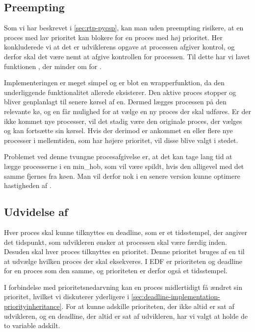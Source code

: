 \subsection{Preempting}

Som vi har beskrevet i \cref{sec:rtp-pycsp}, kan  man uden preempting risikere, at en proces med lav prioritet kan blokere for en proces med høj prioritet. 
Her konkluderede vi at det er udviklerens opgave at processen afgiver kontrol, og derfor skal det være nemt at afgive kontrollen for processen. Til dette har vi lavet funktionen , der minder om  for .

Implementeringen er meget simpel og er blot en wrapperfunktion, da den underliggende funktionalitet allerede eksisterer. Den aktive proces stopper og bliver genplanlagt til senere kørsel af \sched en. Dermed lægges processen på den relevante kø, og  \sched en får mulighed for at vælge en ny proces der skal udføres. Er der ikke kommet nye processer, vil det stadig være den originale proces, der vælges og kan fortsætte sin kørsel. Hvis der derimod er ankommet en eller flere nye processer i mellemtiden, som har højere prioritet, vil disse blive valgt i stedet.

Problemet ved denne tvungne procesafgivelse er, at det kan tage lang tid at lægge processerne i en min\_hob, som vil være spildt, hvis den alligevel med det samme fjernes fra køen. Man vil derfor nok i en senere version kunne optimere hastigheden af .

\subsection{Udvidelse af }
Hver proces skal kunne tilknyttes en deadline, som er et tidsstempel, der angiver det tidspunkt, som udvikleren ønsker at processen skal være færdig inden. 
Desuden skal hver proces tilknyttes en prioritet. Denne prioritet bruges af \sched en til at udvælge hvilken proces der skal eksekveres. I EDF er prioriteten og deadline for en proces som  den samme, og prioriteten er derfor også et tidsstempel.

I forbindelse med prioritetsnedarvning kan en proces midlertidigt få ændret sin prioritet, hvilket vi diskuterer yderligere i \cref{sec:deadline-implementation-priorityinheritance}. For at kunne adskille prioriteten, der ikke altid er sat af udvikleren, og en deadline, der altid er sat af udvikleren, har vi  valgt at holde de to variable adskilt. 


